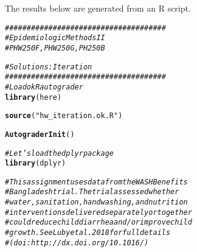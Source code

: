 \documentclass{article}\usepackage[]{graphicx}\usepackage[]{color}
\makeatletter
\newcommand{\hlstr}[1]{\textcolor[rgb]{0.192,0.494,0.8}{#1}}%
\newcommand{\hlcom}[1]{\textcolor[rgb]{0.678,0.584,0.686}{\textit{#1}}}%
\newcommand{\hlstd}[1]{\textcolor[rgb]{0.345,0.345,0.345}{#1}}%
\newcommand{\hlkwd}[1]{\textcolor[rgb]{0.737,0.353,0.396}{\textbf{#1}}}%
\newenvironment{kframe}{%
 \def\at@end@of@kframe{}%
 \ifinner\ifhmode%
  \def\at@end@of@kframe{\end{minipage}}%
  \begin{minipage}{\columnwidth}%
 \fi\fi%
 \def\FrameCommand##1{\hskip\@totalleftmargin \hskip-\fboxsep
 \colorbox{shadecolor}{##1}\hskip-\fboxsep
     \hskip-\linewidth \hskip-\@totalleftmargin \hskip\columnwidth}%
 \MakeFramed {\advance\hsize-\width
   \@totalleftmargin\z@ \linewidth\hsize
   \@setminipage}}%
 {\par\unskip\endMakeFramed%
 \at@end@of@kframe}
\newenvironment{knitrout}{}{} %
\makeatother
\begin{document}
The results below are generated from an R script.

\begin{knitrout}
\color{fgcolor}\begin{kframe}
\begin{alltt}
\hlcom{#####################################}
\hlcom{# Epidemiologic Methods II }
\hlcom{# PHW250F, PHW250G, PH250B}

\hlcom{# Solutions: Iteration}
\hlcom{#####################################}
\hlcom{# Load okR autograder}
\hlkwd{library}\hlstd{(here)}
\end{alltt}


{\ttfamily\noindent\itshape\color{messagecolor}{\#\# here() starts at /Users/Nolan}}\begin{alltt}
\hlkwd{source}\hlstd{(}\hlstr{"hw_iteration.ok.R"}\hlstd{)}
\end{alltt}


{\ttfamily\noindent\color{warningcolor}{\#\# Warning: package 'dplyr' was built under R version 3.5.2}}

{\ttfamily\noindent\itshape\color{messagecolor}{\#\# \\\#\# Attaching package: 'dplyr'}}

{\ttfamily\noindent\itshape\color{messagecolor}{\#\# The following objects are masked from 'package:stats':\\\#\# \\\#\#\ \ \ \  filter, lag}}

{\ttfamily\noindent\itshape\color{messagecolor}{\#\# The following objects are masked from 'package:base':\\\#\# \\\#\#\ \ \ \  intersect, setdiff, setequal, union}}

{\ttfamily\noindent\color{warningcolor}{\#\# Warning: package 'reticulate' was built under R version 3.5.2}}\begin{alltt}
\hlkwd{AutograderInit}\hlstd{()}

\hlcom{# Let's load the dplyr package}
\hlkwd{library}\hlstd{(dplyr)}

\hlcom{# This assignment uses data from the WASH Benefits}
\hlcom{# Bangladesh trial. The trial assessed whether }
\hlcom{# water, sanitation, handwashing, and nutrition }
\hlcom{# interventions delivered separately or together}
\hlcom{# could reduce child diarrhea and/or improve child}
\hlcom{# growth. See Luby et al. 2018 for full details }
\hlcom{# (doi: http://dx.doi.org/10.1016/)}


\end{alltt}
\end{kframe}
\end{knitrout}
\end{document}
